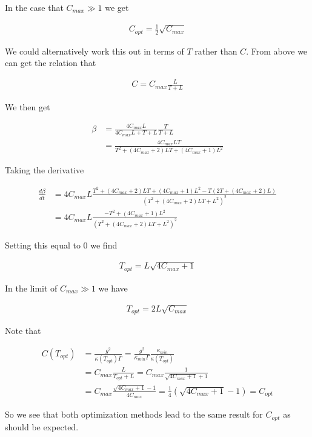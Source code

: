 \documentclass[12pt]{article}
\begin{document}
In the case that $C_{max} \gg 1$ we get

\begin{align}
C_{opt} = \frac{1}{2}\sqrt{C_{max}}
\end{align}

We could alternatively work this out in terms of $T$ rather than $C$. From above we can get the relation that

\begin{align}
C = C_{max} \frac{L}{T+L}
\end{align}

We then get

\begin{align}
\beta &= \frac{4C_{max}L}{4C_{max}L + T + L} \frac{T}{T+L}\\
&= \frac{4C_{max}LT}{T^2 + (4C_{max} + 2)LT + (4C_{max}+1)L^2}
\end{align}

Taking the derivative

\begin{align}
\frac{d\beta}{dt} &= 4C_{max}L \frac{T^2 + (4C_{max}+2)LT + (4C_{max}+1)L^2 - T(2T+(4C_{max}+2)L)}{\left(T^2 + (4C_{max}+2)LT + L^2 \right)^2}\\
&= 4C_{max}L \frac{-T^2 + (4C_{max}+1)L^2}{\left(T^2 + (4C_{max}+2)LT + L^2 \right)^2}
\end{align}

Setting this equal to $0$ we find

\begin{align}
T_{opt} = L \sqrt{4C_{max}+1}
\end{align}

In the limit of $C_{max} \gg 1$ we have

\begin{align}
T_{opt} = 2L \sqrt{C_{max}}
\end{align}


Note that 

\begin{align}
C(T_{opt}) &= \frac{g^2}{\kappa(T_{opt})\Gamma} = \frac{g^2}{\kappa_{min}\Gamma} \frac{\kappa_{min}}{\kappa(T_{opt})}\\
&= C_{max} \frac{L}{T_{opt}+L} = C_{max} \frac{1}{\sqrt{4C_{max}+1} + 1}\\
&= C_{max} \frac{\sqrt{4C_{max}+1}-1}{4C_{max}} = \frac{1}{4}\left(\sqrt{4C_{max}+1}-1 \right) = C_{opt}
\end{align}

So we see that both optimization methods lead to the same result for $C_{opt}$ as should be expected. 
\end{document}
